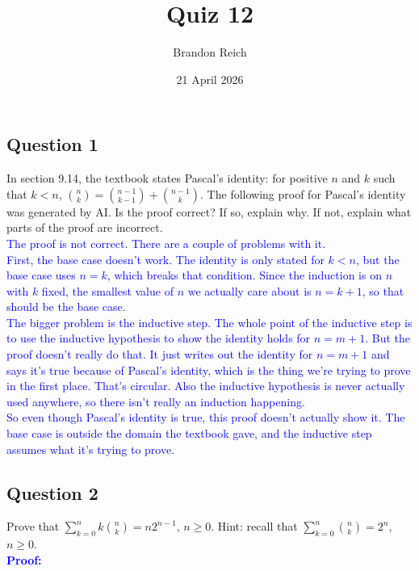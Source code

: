 \documentclass{article}
\title{Quiz 12}
\author{Brandon Reich}
\date{21 April 2026}
\begin{document}
\maketitle

\subsection*{Question 1}
In section 9.14, the textbook states Pascal's identity: for positive $n$ and $k$ such that $k < n$, $\binom{n}{k} = \binom{n-1}{k-1} + \binom{n-1}{k}$. The following proof for Pascal's identity was generated by AI. Is the proof correct? If so, explain why. If not, explain what parts of the proof are incorrect. \\

\textcolor{blue}{
The proof is not correct. There are a couple of problems with it.
} \\

\textcolor{blue}{
First, the base case doesn't work. The identity is only stated for $k < n$, but the base case uses $n = k$, which breaks that condition. Since the induction is on $n$ with $k$ fixed, the smallest value of $n$ we actually care about is $n = k + 1$, so that should be the base case.
} \\

\textcolor{blue}{
The bigger problem is the inductive step. The whole point of the inductive step is to use the inductive hypothesis to show the identity holds for $n = m+1$. But the proof doesn't really do that. It just writes out the identity for $n = m+1$ and says it's true because of Pascal's identity, which is the thing we're trying to prove in the first place. That's circular. Also the inductive hypothesis is never actually used anywhere, so there isn't really an induction happening.
} \\

\textcolor{blue}{
So even though Pascal's identity is true, this proof doesn't actually show it. The base case is outside the domain the textbook gave, and the inductive step assumes what it's trying to prove.
}

\subsection*{Question 2}
Prove that $\sum_{k=0}^{n} k\binom{n}{k} = n 2^{n-1}$, $n \geq 0$. Hint: recall that $\sum_{k=0}^{n} \binom{n}{k} = 2^n$, $n \geq 0$. \\[0.5em]

\textcolor{blue}{\textbf{Proof:}} \\[0.3em]
\end{document}
